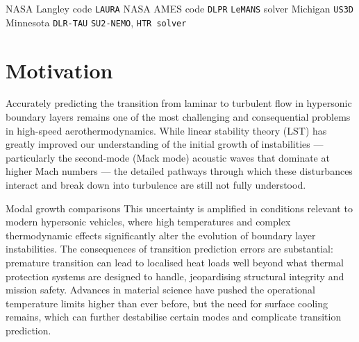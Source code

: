 NASA Langley code \texttt{LAURA} \citep{Cheatwood1996}
NASA AMES code \texttt{DLPR} \citep{Candler1994}
\texttt{LeMANS} solver Michigan \citep{Scalabrin2005}
\texttt{US3D} Minnesota \citep{Nompelis2004}
\texttt{DLR-TAU} \citep{Mack2002}
\texttt{SU2-NEMO}, 
\texttt{HTR solver}


\section{Motivation}



Accurately predicting the transition from laminar to turbulent flow in hypersonic boundary layers remains one of the most challenging and consequential problems in high-speed aerothermodynamics. While linear stability theory (LST) has greatly improved our understanding of the initial growth of instabilities — particularly the second-mode (Mack mode) acoustic waves that dominate at higher Mach numbers — the detailed pathways through which these disturbances interact and break down into turbulence are still not fully understood.

Modal growth comparisons
This uncertainty is amplified in conditions relevant to modern hypersonic vehicles, where high temperatures and complex thermodynamic effects significantly alter the evolution of boundary layer instabilities. The consequences of transition prediction errors are substantial: premature transition can lead to localised heat loads well beyond what thermal protection systems are designed to handle, jeopardising structural integrity and mission safety. Advances in material science have pushed the operational temperature limits higher than ever before, but the need for surface cooling remains, which can further destabilise certain modes and complicate transition prediction.

